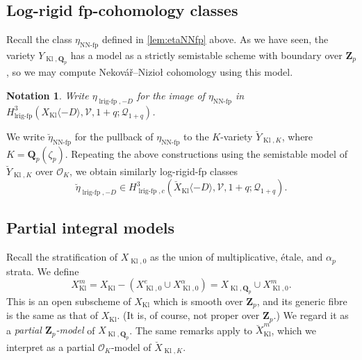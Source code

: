 \documentclass[cjm]{ipart}
\theoremstyle{plain}
\newtheorem{notation}[theorem]{Notation}
\theoremstyle{remark}
\DeclareMathOperator{\fp}{fp}
\DeclareMathOperator{\Kl}{Kl}
\DeclareMathOperator{\lrigfp}{lrig-fp}
\DeclareMathOperator{\NNfp}{NN-fp}
\newcommand{\Nek}{Nekov\'a\v{r}\xspace}
\newcommand{\Niz}{Nizio\l\xspace}
\newcommand{\QQ}{\mathbf{Q}}
\newcommand{\Qp}{\QQ_p}
\newcommand{\Zp}{\mathbf{Z}_p}
\newcommand{\cO}{\mathcal{O}}
\newcommand{\cP}{\mathcal{P}}
\newcommand{\cQ}{\mathcal{Q}}
\newcommand{\cV}{\mathcal{V}}
\numberwithin{equation}{subsection}
\begin{document}
 \subsection{Log-rigid fp-cohomology classes}
  \label{sect:logrigfromPi}
  Recall the class $\eta_{\NNfp}$ defined in \cref{lem:etaNNfp} above. As we have seen, the variety $Y_{\Kl, \Qp}$ has a model as a strictly semistable scheme with boundary over $\Zp$, so we may compute \Nek--\Niz cohomology using this model.

  \begin{notation} Write $\eta_{\lrigfp,-D}$ for the image of $\eta_{\NNfp}$ in $H^3_{\lrigfp}(X_{\Kl}\langle -D\rangle,\cV, 1+q; \cQ_{1+q})$.
  \end{notation}

  We write $\breve\eta_{\NNfp}$ for the pullback of $\eta_{\NNfp}$ to the $K$-variety $\breve{Y}_{\Kl, K}$, where $K = \Qp(\zeta_p)$. Repeating the above constructions using the semistable model of $\breve{Y}_{\Kl, K}$ over $\cO_K$, we obtain similarly log-rigid-fp classes
  \[ \breve\eta_{\lrigfp, -D} \in H^3_{\lrigfp, c}(\breve{X}_{\Kl}\langle -D\rangle,\cV,1+q;\cQ_{1+q}).\]

 \subsection{Partial integral models}
  \label{sect:partialmodels}

  Recall the stratification of $X_{\Kl, 0}$ as the union of multiplicative, \'etale, and $\alpha_p$ strata. We define
  \[ X_{\Kl}^m = X_{\Kl} - \left( X_{\Kl,0}^e \cup X_{\Kl,0}^\alpha\right) = X_{\Kl, \Qp} \cup X_{\Kl, 0}^m.\]
  This is an open subscheme of $X_{\Kl}$ which is smooth over $\Zp$, and its generic fibre is the same as that of $X_{\Kl}$. (It is, of course, not proper over $\Zp$.) We regard it as a \emph{partial $\Zp$-model} of $X_{\Kl, \Qp}$. The same remarks apply to $\breve{X}^m_{\Kl}$, which we interpret as a partial $\cO_K$-model of $\breve{X}_{\Kl, K}$.
\end{document}
